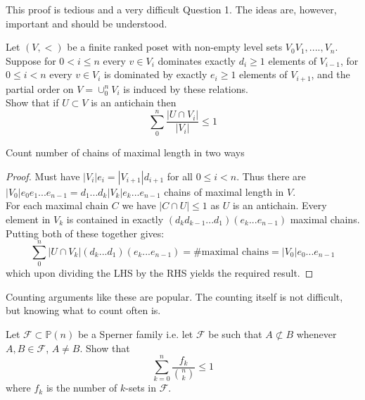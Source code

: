 \documentclass[a4paper]{article}
\renewcommand{\P}{\mathbb P}
\begin{document}
	\begin{remark}
	This proof is tedious and a very difficult Question 1. The ideas are, however, important and should be understood.
	\end{remark}

	\begin{question}[Question 2]
	Let $(V, <)$ be a finite ranked poset with non-empty level sets $V_0 V_1,....,V_n$. Suppose for $0 < i \leq n$ every $v \in V_i$ dominates exactly $d_i \geq 1$ elements of $V_{i-1}$, for $0 \leq i < n$ every $v \in V_i$ is dominated by exactly $e_i \geq 1$ elements of $V_{i+1}$, and the partial order on $V = \cup_0^n V_i$ is induced by these relations.\\
	Show that if $U \subset V$ is an antichain then
	\[\sum_0^n{\frac{|U \cap V_i|}{|V_i|}} \leq 1\]
	\end{question}
	\begin{idea}
	Count number of chains of maximal length in two ways
	\end{idea}
	\begin{proof}
	Must have $|V_i|e_i = |V_{i+1}|d_{i+1}$ for all $0 \leq i < n$. Thus there are $|V_0| e_0 e_1 ... e_{n-1} = d_1 ... d_k |V_k|e_k ... e_{n-1}$ chains of maximal length in $V$.\\
	For each maximal chain $C$ we have $|C \cap U| \leq 1$ as $U$ is an antichain. Every element in $V_k$ is contained in exactly $(d_k d_{k-1} ... d_1)(e_k ... e_{n-1})$ maximal chains.\\
	Putting both of these together gives:
	\[\sum_0^n | U \cap V_k | (d_k ... d_ 1)(e_k ... e_{n-1}) = \# \text{maximal chains} = |V_0|e_0 ... e_{n-1}\]
	which upon dividing the LHS by the RHS yields the required result.

	\end{proof}
	\begin{remark}
	Counting arguments like these are popular. The counting itself is not difficult, but knowing what to count often is.
\end{remark}

\begin{question}[Question 3]
  Let $\mathcal{F} \subset \P(n)$ be a Sperner family i.e. let $\mathcal{F}$ be
  such that $A \not \subset B$ whenever $A, B \in \mathcal{F}$, $A \neq B$. Show
  that
  \[\sum_{k=0}^n \frac{f_k}{{n \choose k}} \leq 1\]
  where $f_k$ is the number of $k$-sets in $\mathcal{F}$.
\end{question}
\end{document}
